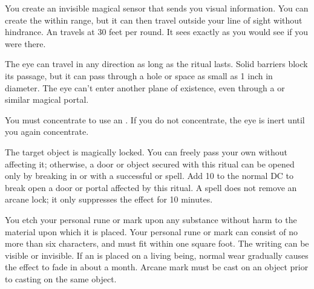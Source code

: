 \spelldur{\durlong \dismissable}
\spelleffect You create an invisible magical sensor that sends you visual information. You can create the  within \rngmed range, but it can then travel outside your line of sight without hindrance. An  travels at 30 feet per round. It sees exactly as you would see if you were there.
\par The eye can travel in any direction as long as the ritual lasts. Solid barriers block its passage, but it can pass through a hole or space as small as 1 inch in diameter. The eye can't enter another plane of existence, even through a  or similar magical portal.
\par You must concentrate to use an . If you do not concentrate, the eye is inert until you again concentrate.

\spelleffect The target object is magically locked. You can freely pass your own  without affecting it; otherwise, a door or object secured with this ritual can be opened only by breaking in or with a successful  or  spell. Add 10 to the normal DC to break open a door or portal affected by this ritual.
\spellnotes A  spell does not remove an arcane lock; it only suppresses the effect for 10 minutes.

\spelleffect You etch your personal rune or mark upon any substance without harm to the material upon which it is placed. Your personal rune or mark can consist of no more than six characters, and must fit within one square foot. The writing can be visible or invisible.
\spellnotes If an  is placed on a living being, normal wear gradually causes the effect to fade in about a month. Arcane mark must be cast on an object prior to casting  on the same object.

